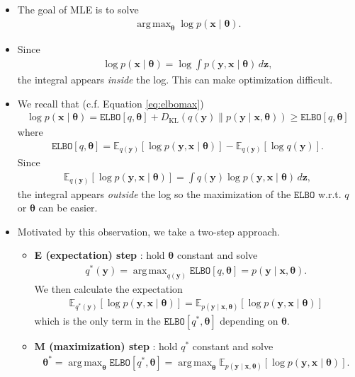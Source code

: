 \documentclass[10pt]{article}
\newcommand{\EE}{\mathbb{E}}
\newcommand{\elbo}{\texttt{ELBO}}
\newcommand{\KL}{D_{\text{KL}}}
\DeclareMathOperator*{\argmax}{arg\,max}
\begin{document}
\begin{itemize}
\item The goal of MLE is to solve
\begin{align*}
\argmax_{\bm{\theta}} \log p(\bm{x} \mid \bm{\theta}).
\end{align*}
\item Since
\begin{align*}
\log p(\bm{x} \mid \bm{\theta}) = \log \int p(\bm{y}, \bm{x} \mid \bm{\theta}) \, d\bm{z},
\end{align*}
the integral appears \textit{inside} the log. This can make optimization difficult.
\item We recall that (c.f. Equation \eqref{eq:elbomax})
\begin{align*}
\log p(\bm{x} \mid \bm{\theta}) = \elbo[q,\bm{\theta}] + \KL(q(\bm{y}) \| p(\bm{y} \mid \bm{x}, \bm{\theta})) \geq \elbo[q,\bm{\theta}]
\end{align*}
where
\begin{align*}
\elbo[q,\bm{\theta}] = \EE_{q(\bm{y})} [ \log p(\bm{y},\bm{x} \mid \bm{\theta}) ] - \EE_{q(\bm{y})} [\log q(\bm{y})].
\end{align*}
Since
\begin{align*}
\EE_{q(\bm{y})} [ \log p(\bm{y},\bm{x} \mid \bm{\theta}) ] = \int q(\bm{y}) \log p(\bm{y},\bm{x} \mid \bm{\theta}) \, d\bm{z},
\end{align*}
the integral appears \textit{outside} the log so the maximization of the $\elbo$ w.r.t. $q$ or $\bm{\theta}$ can be easier.
\item Motivated by this observation, we take a two-step approach.
\begin{itemize}
\item \textbf{E (expectation) step} : hold $\bm{\theta}$ constant and solve 
\begin{align*}
q^*(\bm{y}) = \argmax_{q(\bm{y})} \elbo[q,\bm{\theta}] = p(\bm{y} \mid \bm{x},\bm{\theta}).
\end{align*}
We then calculate the expectation
\begin{align*}
\EE_{q^*(\bm{y})} [ \log p(\bm{y},\bm{x} \mid \bm{\theta}) ] = \EE_{p(\bm{y} \mid \bm{x},\bm{\theta})} [ \log p(\bm{y},\bm{x} \mid \bm{\theta}) ]
\end{align*}
which is the only term in the $\elbo[q^*,\bm{\theta}]$ depending on $\bm{\theta}$.
\item \textbf{M (maximization) step} : hold $q^*$ constant and solve
\begin{align*}
\bm{\theta}^* = \argmax_{\bm{\theta}} \elbo[q^*,\bm{\theta}] = \argmax_{\bm{\theta}} \EE_{p(\bm{y} \mid \bm{x},\bm{\theta})} [ \log p(\bm{y},\bm{x} \mid \bm{\theta}) ].

\end{align*}
\end{itemize}
\end{itemize}
\end{document}
